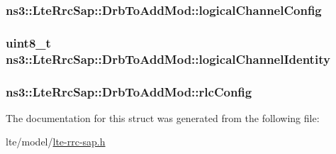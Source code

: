 \subsubsection[{\texorpdfstring{logical\+Channel\+Config}{logicalChannelConfig}}]{ ns3\+::\+Lte\+Rrc\+Sap\+::\+Drb\+To\+Add\+Mod\+::logical\+Channel\+Config}\hypertarget{structns3_1_1LteRrcSap_1_1DrbToAddMod_af761fbd6ee6404f841b5715e09ecca3b}{}\label{structns3_1_1LteRrcSap_1_1DrbToAddMod_af761fbd6ee6404f841b5715e09ecca3b}
\subsubsection[{\texorpdfstring{logical\+Channel\+Identity}{logicalChannelIdentity}}]{\setlength{\rightskip}{0pt plus 5cm}uint8\+\_\+t ns3\+::\+Lte\+Rrc\+Sap\+::\+Drb\+To\+Add\+Mod\+::logical\+Channel\+Identity}\hypertarget{structns3_1_1LteRrcSap_1_1DrbToAddMod_ad23dad5b21e1b89f3d42f1dbd61cfa75}{}\label{structns3_1_1LteRrcSap_1_1DrbToAddMod_ad23dad5b21e1b89f3d42f1dbd61cfa75}
\subsubsection[{\texorpdfstring{rlc\+Config}{rlcConfig}}]{ ns3\+::\+Lte\+Rrc\+Sap\+::\+Drb\+To\+Add\+Mod\+::rlc\+Config}\hypertarget{structns3_1_1LteRrcSap_1_1DrbToAddMod_a67f31637f94f2ce0dbf5d139be73f78e}{}\label{structns3_1_1LteRrcSap_1_1DrbToAddMod_a67f31637f94f2ce0dbf5d139be73f78e}


The documentation for this struct was generated from the following file\+:\begin{DoxyCompactItemize}
\item 
lte/model/\hyperlink{lte-rrc-sap_8h}{lte-\/rrc-\/sap.\+h}\end{DoxyCompactItemize}
